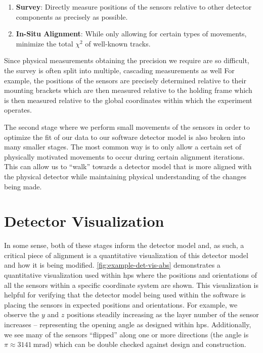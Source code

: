 \begin{enumerate}
	\item \textbf{Survey}: Directly measure positions of the sensors relative to other
	      detector components as precisely as possible.
	\item \textbf{In-Situ Alignment}: While only allowing for certain types of movements,
	      minimize the total $\chi^2$ of well-known tracks.
\end{enumerate}

Since physical measurements obtaining the precision we require are so difficult,
the survey is often split into multiple, cascading measurements as well
For example, the positions of the sensors are precisely determined relative to their
mounting brackets which are then measured relative to the holding frame
which is then measured relative to the global coordinates within which the
experiment operates.

The second stage where we perform small movements of the sensors in order to optimize
the fit of our data to our software detector model is also broken into many smaller
stages. The most common way is to only allow a certain set of physically motivated
movements to occur during certain alignment iterations. This can allow us to ``walk''
towards a detector model that is more aligned with the physical detector while
maintaining physical understanding of the changes being made.

\section{Detector Visualization}

In some sense, both of these stages inform the detector model and, as such,
a critical piece of alignment is a quantitative visualization of this detector
model and how it is being modified. \cref{fig:example-det-vis-abs} demonstrates a
quantitative visualization used within \ac{hps} where the positions and orientations of 
all the sensors within a specific coordinate system are shown.
This visualization is helpful for verifying that the detector model being used
within the software is placing the sensors in expected positions and orientations.
For example, we observe the $y$ and $z$ positions steadily increasing as the layer
number of the sensor increases -- representing the opening angle as designed within
\ac{hps}. Additionally, we see many of the sensors ``flipped'' along one or more
directions (the angle is $\pi \approx \qty{3141}{\milli\radian}$) which can be
double checked against design and construction.

